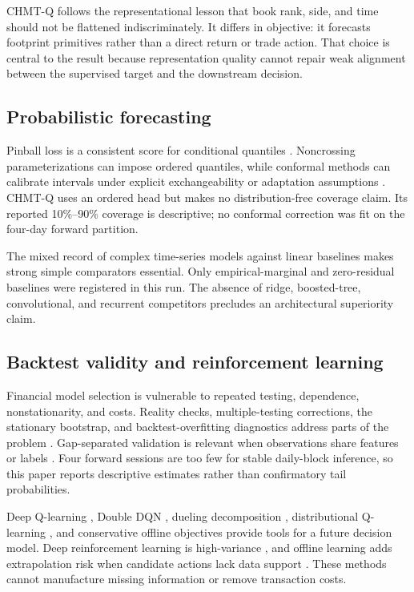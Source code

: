 \documentclass[10pt,letterpaper]{article}
\numberwithin{equation}{section}
\theoremstyle{definition}
\theoremstyle{remark}
\begin{document}
CHMT-Q follows the representational lesson that book rank, side, and time should
not be flattened indiscriminately. It differs in objective: it forecasts
footprint primitives rather than a direct return or trade action. That choice is
central to the result because representation quality cannot repair weak
alignment between the supervised target and the downstream decision.

\subsection{Probabilistic forecasting}

Pinball loss is a consistent score for conditional quantiles
\citep{gneiting2007}. Noncrossing parameterizations can impose ordered
quantiles, while conformal methods can calibrate intervals under explicit
exchangeability or adaptation assumptions \citep{romano2019}. CHMT-Q uses an
ordered head but makes no distribution-free coverage claim. Its reported
10\%--90\% coverage is descriptive; no conformal correction was fit on the
four-day forward partition.

The mixed record of complex time-series models against linear baselines
\citep{zeng2023} makes strong simple comparators essential. Only
empirical-marginal and zero-residual baselines were registered in this run.
The absence of ridge, boosted-tree, convolutional, and recurrent competitors
precludes an architectural superiority claim.

\subsection{Backtest validity and reinforcement learning}

Financial model selection is vulnerable to repeated testing, dependence,
nonstationarity, and costs. Reality checks, multiple-testing corrections, the
stationary bootstrap, and backtest-overfitting diagnostics address parts of the
problem \citep{white2000,politis1994,harvey2016,bailey2017}. Gap-separated
validation is relevant when observations share features or labels
\citep{racine2000}. Four forward sessions are too few for stable daily-block
inference, so this paper reports descriptive estimates rather than confirmatory
tail probabilities.

Deep Q-learning \citep{mnih2015}, Double DQN \citep{hasselt2016}, dueling
decomposition \citep{wang2016dueling}, distributional Q-learning
\citep{dabney2018}, and conservative offline objectives \citep{kumar2020}
provide tools for a future decision model. Deep reinforcement learning is
high-variance \citep{henderson2018}, and offline learning adds extrapolation
risk when candidate actions lack data support \citep{levine2020}. These methods
cannot manufacture missing information or remove transaction costs.
\end{document}

